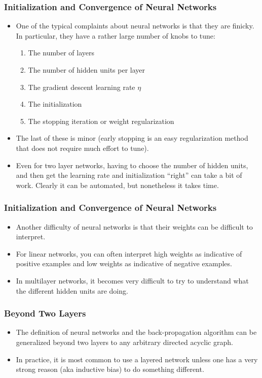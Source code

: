 \documentclass[trans]{beamer}
\begin{document}
\begin{frame}
  \frametitle{Initialization and Convergence of Neural Networks}
\begin{itemize}
\item
One of the typical complaints about neural networks is that they are
finicky.  In particular, they have a rather large number of knobs to
tune:
%
\begin{enumerate}
\item The number of layers
\item The number of hidden units per layer
\item The gradient descent learning rate $\eta$
\item The initialization
\item The stopping iteration or weight regularization
\end{enumerate}
%
\item The last of these is minor (early stopping is an easy regularization
method that does not require much effort to tune).
\item  Even for two layer networks, having to choose
the number of hidden units, and then get the learning rate and
initialization ``right'' can take a bit of work.  Clearly it can be
automated, but nonetheless it takes time.
\end{itemize}
\end{frame}

\begin{frame}
  \frametitle{Initialization and Convergence of Neural Networks}
\begin{itemize}
\item
Another difficulty of neural networks is that their weights can be
difficult to interpret. 
\item  For linear networks, you
can often interpret high weights as indicative of positive examples
and low weights as indicative of negative examples.  
\item In multilayer
networks, it becomes very difficult to try to understand what the
different hidden units are doing.  
\end{itemize}
\end{frame}



\begin{frame}
  \frametitle{Beyond Two Layers}
\begin{itemize}
\item
The definition of neural networks and the back-propagation algorithm
can be generalized beyond two layers to any arbitrary directed acyclic
graph. 
\item In practice, it is most common to use a layered network unless one has a very
strong reason (aka inductive bias) to do something different.
\end{itemize}
\end{frame}
\end{document}
